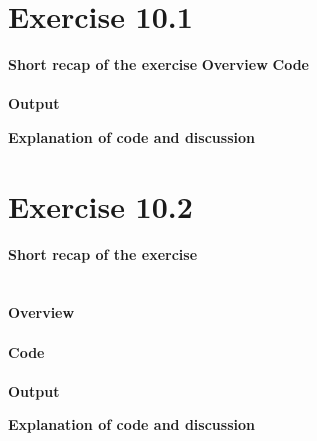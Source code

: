 \documentclass{article}
\newcommand\pythonstyle{\lstset{
language=python,
breaklines=true,
basicstyle=\ttfamily\small,
otherkeywords={1, 2, 3, 4, 5, 6, 7, 8 ,9 , 0, -, =, +, [, ], (, \), \{, \}, :, *, !},             %
keywordstyle=\color{blue},
emph={class, pass, in, for, while, if, is, elif, else, not, and, or, OR
    def, print, exec, break, continue, return},
emphstyle=\color{black}\bfseries,
emph={[2]True, False, None, self},
emphstyle=[2]\color{purple},
emph={[3]from, import, as},
emphstyle=[3]\color{blue},
stringstyle=\color{red},
frame=tb,
showstringspaces=false,
morecomment=[s]{"""}{"""},
commentstyle=\color{gray},
rulesepcolor=\color{blue},
title=\lstname
}}
\newcommand\pythonexternal[2][]{{
\pythonstyle
}}
\begin{document}
\section{Exercise 10.1}
\textbf{Short recap of the exercise}
\textit{}
\textbf{Overview}
\textbf{Code}\\
~\\
\textbf{Output}
\begin{pythonOutput}

\end{pythonOutput}
\textbf{Explanation of code and discussion}\\


\section{Exercise 10.2}
\textbf{Short recap of the exercise}\\
\textit{}\\
~\\
\textbf{Overview}\\

~\\
\textbf{Code}\\
~\\
\textbf{Output}
\begin{pythonOutput}

\end{pythonOutput}
\textbf{Explanation of code and discussion}\\
\end{document}

